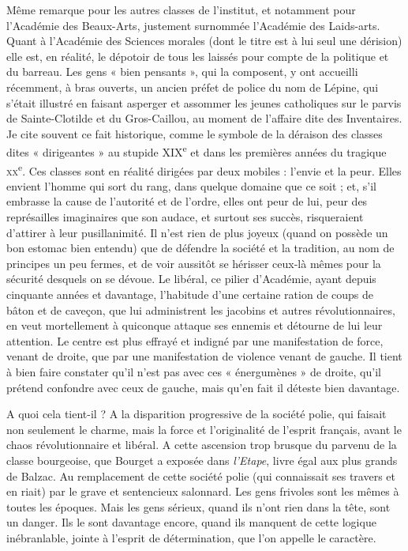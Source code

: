 \documentclass[french,twoside]{book} %
\begin{document}
Même remarque pour les autres classes de l’institut, et notamment pour l’Académie des Beaux-Arts, justement surnommée l’Académie des Laids-arts. Quant à l’Académie des Sciences morales (dont le titre est à lui seul une dérision) elle est, en réalité, le dépotoir de tous les laissés pour compte de la politique et du barreau. Les gens « bien pensants », qui la composent, y ont accueilli récemment, à bras ouverts, un ancien préfet de police du nom de Lépine, qui s’était illustré en faisant asperger et assommer les jeunes catholiques sur le parvis de Sainte-Clotilde et du Gros-Caillou, au moment de l’affaire dite des Inventaires. Je cite souvent ce fait historique, comme le symbole de la déraison des classes dites « dirigeantes » au stupide XIX\textsuperscript{e} et dans les premières années du tragique \textsc{xx}\textsuperscript{e}. Ces classes sont en réalité dirigées par deux mobiles : l’envie et la peur. Elles envient l’homme qui sort du rang, dans quelque domaine que ce soit ; et, s’il embrasse la cause de l’autorité et de l’ordre, elles ont peur de lui, peur des représailles imaginaires que son audace, et surtout ses succès, risqueraient d’attirer à leur pusillanimité. Il n’est rien de plus joyeux (quand on possède un bon estomac bien entendu) que de défendre la société et la tradition, au nom de principes un peu fermes, et de voir aussitôt se hérisser ceux-là mêmes pour la sécurité desquels on se dévoue. Le libéral, ce pilier d’Académie, ayant depuis cinquante années et davantage, l’habitude d’une certaine ration de coups de bâton et de caveçon, que lui administrent les jacobins et autres révolutionnaires, en veut mortellement à quiconque attaque ses ennemis et détourne de lui leur attention. Le centre est plus effrayé et indigné par une manifestation de force, venant de droite, que par une manifestation de violence venant de gauche. Il tient à bien faire constater qu’il n’est pas avec ces « énergumènes » de droite, qu’il prétend confondre avec ceux de gauche, mais qu’en fait il déteste bien davantage.\par
A quoi cela tient-il ? A la disparition progressive de la société polie, qui faisait non seulement le charme, mais la force et l’originalité de l’esprit français, avant le chaos révolutionnaire et libéral. A cette ascension trop brusque du parvenu de la classe bourgeoise, que Bourget a exposée dans {\itshape l’Etape}, livre égal aux plus grands de Balzac. Au remplacement de cette société polie (qui connaissait ses travers et en riait) par le grave et sentencieux salonnard. Les gens frivoles sont les mêmes à toutes les époques. Mais les gens sérieux, quand ils n’ont rien dans la tête, sont un danger. Ils le sont davantage encore, quand ils manquent de cette logique inébranlable, jointe à l’esprit de détermination, que l’on appelle le caractère.\par
\end{document}
